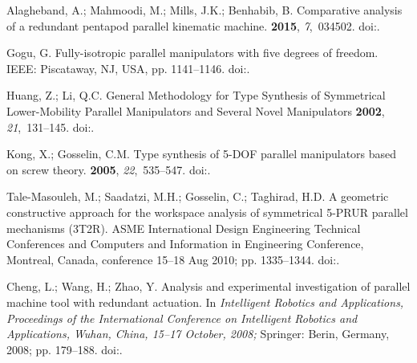 \documentclass[robotics,article,accept,moreauthors,pdftex]{Definitions/mdpi}
\begin{document}
\begin{thebibliography}{999}
Alagheband, A.; Mahmoodi, M.; Mills, J.K.; Benhabib, B.
\newblock Comparative analysis of a redundant pentapod parallel kinematic
  machine.
 {\bf 2015}, {\em 7},~034502.
\newblock
  doi:{\href{https://doi.org/10.1115/1.4028933}{}}.

Gogu, G.
\newblock Fully-isotropic parallel manipulators with five degrees of freedom.
 IEEE: Piscataway, NJ, USA, pp. 1141--1146.
\newblock
  doi:{\href{https://doi.org/10.1109/ROBOT.2006.1641863}{}}.

Huang, Z.; Li, Q.C.
\newblock General Methodology for Type Synthesis of Symmetrical Lower-Mobility
  Parallel Manipulators and Several Novel Manipulators
 {\bf 2002}, {\em 21},~131--145.
\newblock
  doi:{\href{https://doi.org/10.1177/027836402760475342}{}}.

Kong, X.; Gosselin, C.M.
\newblock Type synthesis of 5-DOF parallel manipulators based on screw theory.
 {\bf 2005}, {\em 22},~535--547.
\newblock
  doi:{\href{https://doi.org/10.1002/rob.20084}{}}.

Tale-Masouleh, M.; Saadatzi, M.H.; Gosselin, C.; Taghirad, H.D.
\newblock A geometric constructive approach for the workspace analysis of
symmetrical 5-PRUR parallel mechanisms (3T2R).
\newblock  ASME International Design Engineering Technical Conferences and
Computers and Information in Engineering Conference, Montreal, Canada, conference 15--18 Aug 2010; pp. 1335--1344.
\newblock
doi:{\href{https://doi.org/10.1115/DETC2010-28509}{}}.

Cheng, L.; Wang, H.; Zhao, Y.
\newblock Analysis and experimental investigation of parallel machine tool with
  redundant actuation.
\newblock  In {\em Intelligent Robotics and Applications, Proceedings of the International Conference on Intelligent Robotics and Applications, Wuhan, China, 15--17 October, 2008;} Springer: Berin, Germany, 2008; pp. 179--188.
\newblock
  doi:{\href{https://doi.org/10.1007/978-3-540-88513-9_20}{}}.


\end{thebibliography}
\end{document}
